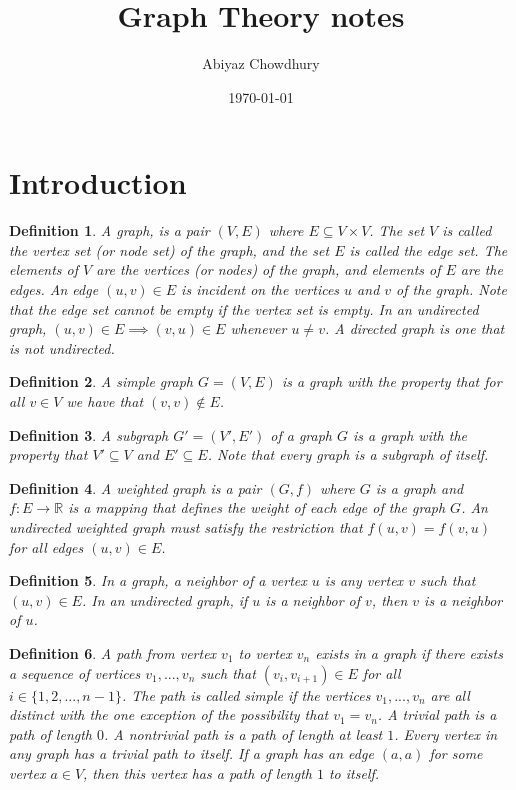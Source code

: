\documentclass[a4paper]{article}
\title{\textbf{Graph Theory notes}}
\author{Abiyaz Chowdhury}
\date{\today}
\newtheorem{mydef}{Definition}
\numberwithin{mytheorem}{section}
\numberwithin{mydef}{section}
\numberwithin{example}{section}
\begin{document}
\maketitle

\section{Introduction}

\begin{mydef} A graph, is a pair $(V,E)$ where $E \subseteq V \times V$. The set $V$ is called the vertex set (or node set) of the graph, and the set $E$ is called the edge set. The elements of $V$ are the vertices (or nodes) of the graph, and elements of $E$ are the edges. An edge $(u,v) \in E$ is incident on the vertices $u$ and $v$ of the graph. Note that the edge set cannot be empty if the vertex set is empty. In an undirected graph, $(u,v) \in E \implies (v,u) \in E$ whenever $u \neq v$. A directed graph is one that is not undirected.
\end{mydef}

\begin{mydef} A simple graph $G = (V,E)$ is a graph with the property that for all $v \in V$ we have that $(v,v) \notin E$.
\end{mydef}

\begin{mydef} A subgraph $G' = (V',E')$ of a graph $G$ is a graph with the property that $V' \subseteq V$ and $E' \subseteq E$. Note that every graph is a subgraph of itself.
\end{mydef}

\begin{mydef} A weighted graph is a pair $(G,f)$ where $G$ is a graph and $f : E \rightarrow \mathbb{R}$ is a mapping that defines the weight of each edge of the graph $G$. An undirected weighted graph must satisfy the restriction that $f(u,v) = f(v,u)$ for all edges $(u,v) \in E$.
\end{mydef}

\begin{mydef} In a graph, a neighbor of a vertex $u$ is any vertex $v$ such that $(u,v) \in E$. In an undirected graph, if $u$ is a neighbor of $v$, then $v$ is a neighbor of $u$.
\end{mydef}

\begin{mydef} A path from vertex $v_{1}$ to vertex $v_{n}$ exists in a graph if there exists a sequence of vertices $v_{1},...,v_{n}$ such that $(v_{i},v_{i+1}) \in E$ for all $i \in \{ 1,2,...,n-1\}$. The path is called simple if the vertices $v_{1},...,v_{n}$ are all distinct with the one exception of the possibility that $v_{1} = v_{n}$. A trivial path is a path of length $0$. A nontrivial path is a path of length at least $1$. Every vertex in any graph has a trivial path to itself. If a graph has an edge $(a,a)$ for some vertex $a \in V$, then this vertex has a path of length $1$ to itself.
\end{mydef}
\end{document}
